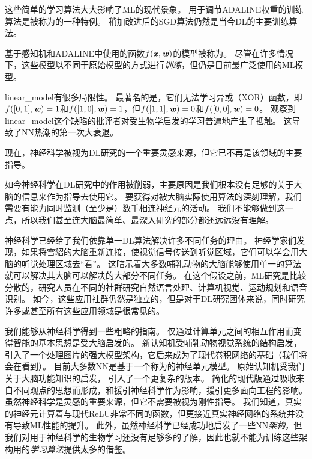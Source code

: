 这些简单的学习算法大大影响了\gls{ML}的现代景象。
用于调节ADALINE权重的训练算法是被称为的一种特例。
稍加改进后的\gls{SGD}算法仍然是当今\gls{DL}的主要训练算法。

基于感知机和ADALINE中使用的函数$f(\boldsymbol{\mathit{x}}, \boldsymbol{\mathit{w}})$的模型被称为。
尽管在许多情况下，这些模型以不同于原始模型的方式进行\emph{训练}，但仍是目前最广泛使用的\gls{ML}模型。

\gls{linear_model}有很多局限性。
最著名的是，它们无法学习异或（XOR）函数，即$f([0,1], \boldsymbol{\mathit{w}}) = 1$和$f([1,0], \boldsymbol{\mathit{w}})=1$，但$f([1,1], \boldsymbol{\mathit{w}})=0$和$f([0,0],\boldsymbol{\mathit{w}})= 0$。
观察到\gls{linear_model}这个缺陷的批评者对受生物学启发的学习普遍地产生了抵触\citep{Minsky69}。
这导致了\gls{NN}热潮的第一次大衰退。

现在，神经科学被视为\gls{DL}研究的一个重要灵感来源，但它已不再是该领域的主要指导。


如今神经科学在\gls{DL}研究中的作用被削弱，主要原因是我们根本没有足够的关于大脑的信息来作为指导去使用它。
要获得对被大脑实际使用算法的深刻理解，我们需要有能力同时监测（至少是）数千相连神经元的活动。
我们不能够做到这一点，所以我们甚至连大脑最简单、最深入研究的部分都还远远没有理解\citep{olshausen:2005}。

神经科学已经给了我们依靠单一\gls{DL}算法解决许多不同任务的理由。
神经学家们发现，如果将雪貂的大脑重新连接，使视觉信号传送到听觉区域，它们可以学会用大脑的听觉处理区域去``看''\citep{von2000visual}。
这暗示着大多数哺乳动物的大脑能够使用单一的算法就可以解决其大脑可以解决的大部分不同任务。
在这个假设之前，\gls{ML}研究是比较分散的，研究人员在不同的社群研究自然语言处理、计算机视觉、运动规划和语音识别。
如今，这些应用社群仍然是独立的，但是对于\gls{DL}研究团体来说，同时研究许多或甚至所有这些应用领域是很常见的。

我们能够从神经科学得到一些粗略的指南。
仅通过计算单元之间的相互作用而变得智能的基本思想是受大脑启发的。
新认知机\citep{Fukushima80}受哺乳动物视觉系统的结构启发，引入了一个处理图片的强大模型架构，它后来成为了现代卷积网络的基础\citep{LeCun98-small}（我们将会在看到）。
目前大多数\gls{NN}是基于一个称为的神经单元模型。
原始认知机\citep{Fukushima75}受我们关于大脑功能知识的启发， 引入了一个更复杂的版本。
简化的现代版通过吸收来自不同观点的思想而形成，\citet{Nair-2010}和\citet{Glorot+al-AI-2011-small}援引神经科学作为影响，\citet{Jarrett-ICCV2009}援引更多面向工程的影响。
虽然神经科学是灵感的重要来源，但它不需要被视为刚性指导。
我们知道，真实的神经元计算着与现代\gls{ReLU}非常不同的函数，但更接近真实神经网络的系统并没有导致\gls{ML}性能的提升。
此外，虽然神经科学已经成功地启发了一些\gls{NN}\emph{架构}，但我们对用于神经科学的生物学习还没有足够多的了解，因此也就不能为训练这些架构用的\emph{学习算法}提供太多的借鉴。


